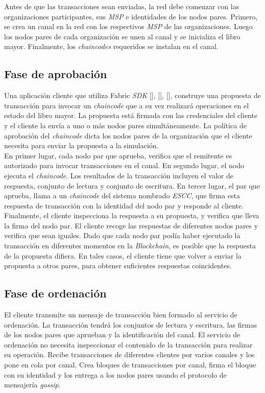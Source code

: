 \vspace{1 cm}
Antes de que las transacciones sean enviadas, la red debe comenzar con las organizaciones participantes, sus \emph{MSP} e identidades de los nodos pares. Primero, se crea un canal en la red con los respectivos \emph{MSP} de las organizaciones. Luego los nodos pares de cada organizaci\'on se unen al canal y se inicializa el libro mayor. Finalmente, los \emph{chaincodes} requeridos se instalan en el canal.


\subsection{Fase de aprobaci\'on}
Una aplicaci\'on cliente que utiliza Fabric \emph{SDK} [\cite{Go-SDK}], [\cite{Node-SDK}], [\cite{Java-SDK}], construye una propuesta de transacci\'on para invocar un \emph{chaincode} que a su vez realizar\'a operaciones en el estado del libro mayor. La propuesta est\'a firmada con las credenciales del cliente y el cliente la env\'ia a uno o m\'as nodos pares simult\'aneamente. La pol\'itica de aprobaci\'on del \emph{chaincode} dicta los nodos pares de la organizaci\'on que el cliente necesita para enviar la propuesta a la simulaci\'on.\\

En primer lugar, cada nodo par que aprueba, verifica que el remitente es autorizado para invocar transacciones en el canal. En segundo lugar, el nodo ejecuta el \emph{chaincode}. Los resultados de la transacci\'on incluyen el valor de respuesta, conjunto de lectura y conjunto de escritura. En tercer lugar, el par que aprueba, llama a un \emph{chaincode} del sistema nombrado \emph{ESCC}, que firma esta respuesta de transacci\'on con la identidad del nodo par y responde al cliente.\\

Finalmente, el cliente inspecciona la respuesta a su propuesta, y verifica que lleva la firma del nodo par. El cliente recoge las respuestas de diferentes nodos pares y verifica que sean iguales. Dado que cada nodo par pod\'ia haber ejecutado la transacci\'on en diferentes momentos en la \emph{Blockchain}, es posible que la respuesta de la propuesta difiera. En tales casos, el cliente tiene que volver a enviar la propuesta a otros pares, para obtener suficientes respuestas coincidentes.

\subsection{Fase de ordenaci\'on}
El cliente transmite un mensaje de transacci\'on bien formado al servicio de ordenaci\'on. La transacci\'on tendr\'a los conjuntos de lectura y escritura, las firmas de los nodos pares que aprueban y la identificaci\'on del canal. El servicio de ordenaci\'on no necesita inspeccionar el contenido de la transacci\'on para realizar su operaci\'on. Recibe transacciones de diferentes clientes por varios canales y los pone en cola por canal. Crea bloques de transacciones por canal, firma el bloque con su identidad y los entrega a los nodos pares usando el protocolo de mensajer\'ia \emph{gossip}.

